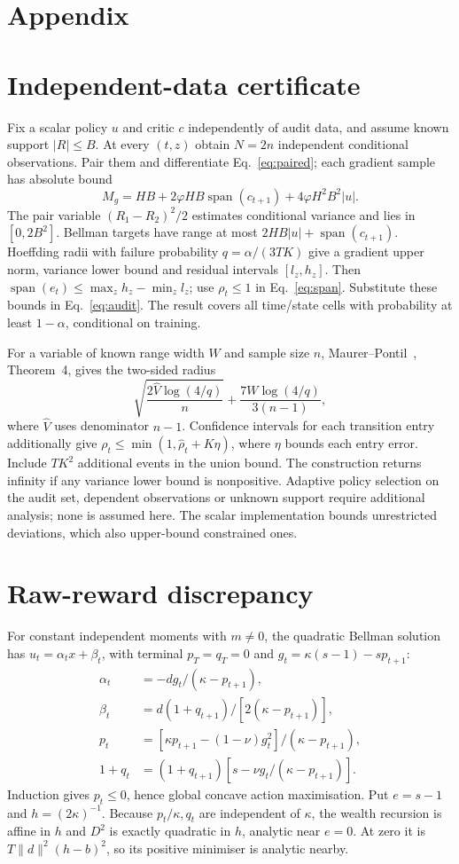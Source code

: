 \documentclass[sigconf,anonymous,review]{acmart}
\newcommand{\spn}{\operatorname{span}}
\begin{document}


\appendix
\section*{Appendix}
\section{Independent-data certificate}\label{app:data}
Fix a scalar policy $u $ and critic $c $ independently of audit data, and assume known support $|R|\le B $. At every $(t,z)$ obtain $N=2n $ independent conditional observations. Pair them and differentiate Eq.~\eqref{eq:paired}; each gradient sample has absolute bound
\[
 M_g=HB+2\varphi HB\spn(c_{t+1})+4\varphi H^2B^2|u|.
\]
The pair variable $(R_1-R_2)^2/2$ estimates conditional variance and lies in $[0,2B^2]$. Bellman targets have range at most $2HB|u|+\spn(c_{t+1})$. Hoeffding radii with failure probability $q=\alpha/(3TK)$ give a gradient upper norm, variance lower bound and residual intervals $[l_z,h_z]$. Then $\spn(e_t)\le\max_z h_z-\min_z l_z $; use $\rho_t\le1$ in Eq.~\eqref{eq:span}. Substitute these bounds in Eq.~\eqref{eq:audit}. The result covers all time/state cells with probability at least $1-\alpha $, conditional on training.

For a variable of known range width $W $ and sample size $n $, Maurer--Pontil~\cite{maurer2009}, Theorem~4, gives the two-sided radius
\[
 \sqrt{\frac{2\widehat V\log(4/q)}n}
 +\frac{7W\log(4/q)}{3(n-1)},
\]
where $\widehat V $ uses denominator $n-1$. Confidence intervals for each transition entry additionally give $\rho_t\le\min(1,\widehat\rho_t+K\eta)$, where $\eta $ bounds each entry error. Include $TK^2$ additional events in the union bound. The construction returns infinity if any variance lower bound is nonpositive. Adaptive policy selection on the audit set, dependent observations or unknown support require additional analysis; none is assumed here. The scalar implementation bounds unrestricted deviations, which also upper-bound constrained ones.

\section{Raw-reward discrepancy}\label{app:raw}
For constant independent moments with $m\ne0$, the quadratic Bellman solution has $u_t=\alpha_tx+\beta_t $, with terminal $p_T=q_T=0$ and $g_t=\kappa(s-1)-sp_{t+1}$:
\begin{align*}
\alpha_t&=-dg_t/(\kappa-p_{t+1}),\\
\beta_t&=d(1+q_{t+1})/[2(\kappa-p_{t+1})],\\
p_t&=[\kappa p_{t+1}-(1-\nu)g_t^2]/(\kappa-p_{t+1}),\\
1+q_t&=(1+q_{t+1})[s-\nu g_t/(\kappa-p_{t+1})].
\end{align*}
Induction gives $p_t\le0$, hence global concave action maximisation. Put $e=s-1$ and $h=(2\kappa)^{-1}$. Because $p_t/\kappa,q_t $ are independent of $\kappa $, the wealth recursion is affine in $h $ and $D^2$ is exactly quadratic in $h $, analytic near $e=0$. At zero it is $T\|d\|^2(h-b)^2$, so its positive minimiser is analytic nearby.
\end{document}
